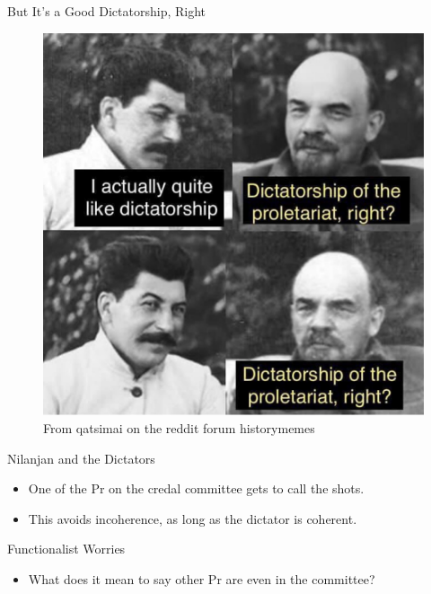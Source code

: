 \documentclass[
  ignorenonframetext,
]{beamer}
\providecommand{\tightlist}{%
  \setlength{\itemsep}{0pt}\setlength{\parskip}{0pt}}
\begin{document}
\begin{frame}{But It's a Good Dictatorship, Right}
\protect\hypertarget{but-its-a-good-dictatorship-right}{}
~

\begin{figure}
\centering
\includegraphics[width=\textwidth,height=0.7\textheight]{dictatorship.jpg}
\caption{From qatsimai on the reddit forum historymemes}
\end{figure}
\end{frame}

\begin{frame}{Nilanjan and the Dictators}
\protect\hypertarget{nilanjan-and-the-dictators}{}
\begin{itemize}
\tightlist
\item
  One of the Pr on the credal committee gets to call the shots.
\item
  This avoids incoherence, as long as the dictator is coherent.
\end{itemize}
\end{frame}

\begin{frame}{Functionalist Worries}
\protect\hypertarget{functionalist-worries}{}
\begin{itemize}
\tightlist
\item
  What does it mean to say other Pr are even in the committee?
\end{itemize}
\end{frame}
\end{document}
